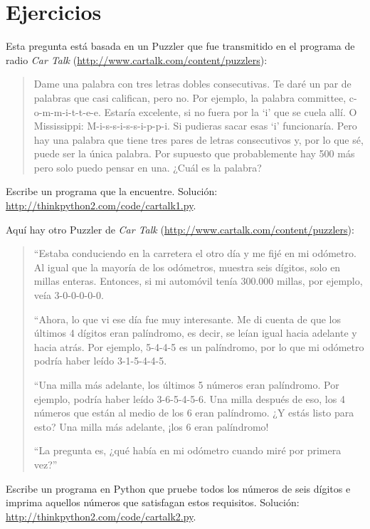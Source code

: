 \documentclass[10pt]{book}
\begin{document}
\section{Ejercicios}

\begin{exercise}

Esta pregunta está basada en un Puzzler que fue transmitido en el programa
de radio {\em Car Talk}
(\url{http://www.cartalk.com/content/puzzlers}):

\begin{quote}
Dame una palabra con tres letras dobles consecutivas. Te daré un
par de palabras que casi califican, pero no. Por ejemplo, la palabra
committee, c-o-m-m-i-t-t-e-e. Estaría excelente, si no fuera por la `i' que
se cuela allí. O Mississippi: M-i-s-s-i-s-s-i-p-p-i. Si pudieras
sacar esas `i' funcionaría. Pero hay una palabra que tiene tres
pares de letras consecutivos y, por lo que sé, puede ser
la única palabra. Por supuesto que probablemente hay 500 más pero solo puedo
pensar en una. ¿Cuál es la palabra?
\end{quote}

Escribe un programa que la encuentre.
Solución: \url{http://thinkpython2.com/code/cartalk1.py}.

\end{exercise}


\begin{exercise}
Aquí hay otro Puzzler de {\em Car Talk}
(\url{http://www.cartalk.com/content/puzzlers}):

\begin{quote}
``Estaba conduciendo en la carretera el otro día y me fijé en
mi odómetro. Al igual que la mayoría de los odómetros, muestra seis dígitos,
solo en millas enteras. Entonces, si mi automóvil tenía 300.000
millas, por ejemplo, veía 3-0-0-0-0-0.

``Ahora, lo que vi ese día fue muy interesante. Me di cuenta de que los
últimos 4 dígitos eran palíndromo, es decir, se leían igual hacia adelante
y hacia atrás. Por ejemplo, 5-4-4-5 es un palíndromo, por lo que mi odómetro
podría haber leído 3-1-5-4-4-5.

``Una milla más adelante, los últimos 5 números eran palíndromo. Por ejemplo,
podría haber leído 3-6-5-4-5-6.  Una milla después de eso, los 4 números que están
al medio de los 6 eran palíndromo.  ¿Y estás listo para esto? Una milla más adelante,
¡los 6 eran palíndromo!

``La pregunta es, ¿qué había en mi odómetro cuando miré por primera vez?''
\end{quote}

Escribe un programa en Python que pruebe todos los números de seis dígitos e imprima
aquellos números que satisfagan estos requisitos.
Solución: \url{http://thinkpython2.com/code/cartalk2.py}.

\end{exercise}
\end{document}
